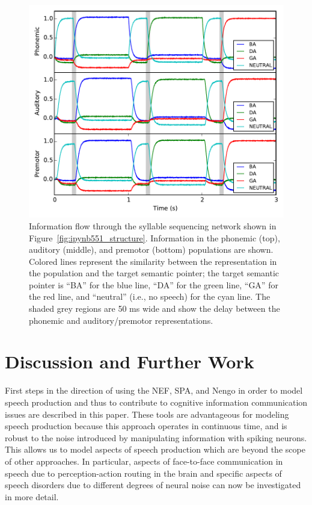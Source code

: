 \documentclass[conference]{IEEEtran}
\begin{document}
\begin{figure}
\centering
\includegraphics[width=\columnwidth]{ipynb551_output}
\caption{Information flow through the syllable sequencing
  network shown in Figure~\ref{fig:ipynb551_structure}.
  Information in the phonemic (top), auditory (middle),
  and premotor (bottom) populations are shown.
  Colored lines represent the similarity between the
  representation in the population and the target semantic pointer;
  the target semantic pointer is ``BA'' for the blue line,
  ``DA'' for the green line, ``GA'' for the red line,
  and ``neutral'' (i.e., no speech) for the cyan line.
  The shaded grey regions are 50 ms wide and show the delay
  between the phonemic and auditory/premotor representations.}
\label{fig:ipynb551_output}
\end{figure}

\section{Discussion and Further Work}

First steps in the direction of using the NEF, SPA, and Nengo
in order to model speech production and thus to contribute
to cognitive information communication issues
\cite{Baranyi2012} are
described in this paper. These tools are advantageous
for modeling speech production because this
approach operates in continuous time, and is robust to the
noise introduced by manipulating information with spiking neurons.
This allows us to model aspects of speech production
which are beyond the scope of other approaches. In particular,
aspects of face-to-face communication in speech due to
perception-action routing in the brain and specific aspects of speech
disorders due to different degrees of neural noise
can now be investigated in more detail.
\end{document}
